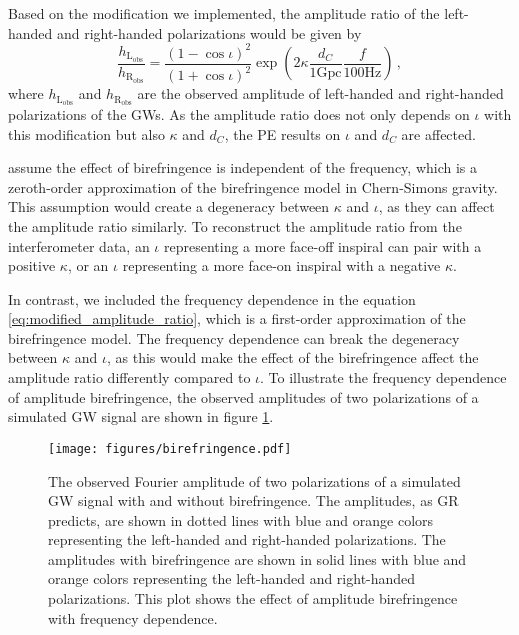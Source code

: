 \documentclass[aps,prd,twocolumn,superscriptaddress,preprintnumbers,floatfix,nofootinbib]{revtex4-2}
\begin{document}
Based on the modification we implemented, the amplitude ratio of the left-handed and right-handed polarizations would be given by
\begin{equation}
    \frac{h_\mathrm{L_{obs}}}{h_\mathrm{R_{obs}}}=\frac{\left(1-\cos\iota\right)^2}{\left(1+\cos\iota\right)^2}\exp\left({2\kappa\frac{d_C}{1\mathrm{Gpc}}\frac{f}{100\mathrm{Hz}}}\right)\,,
    \label{eq:modified_amplitude_ratio}
\end{equation}
where $h_\mathrm{L_{obs}}$ and $h_\mathrm{R_{obs}}$ are the observed amplitude of left-handed and right-handed polarizations of the GWs.
As the amplitude ratio does not only depends on $\iota$ with this modification but also $\kappa$ and $d_C$, the PE results on $\iota$ and $d_C$ are affected.

\citet{Okounkova_2022} assume the effect of birefringence is independent of the frequency, which is a zeroth-order approximation of the birefringence model in Chern-Simons gravity.
This assumption would create a degeneracy between $\kappa$ and $\iota$, as they can affect the amplitude ratio similarly.
To reconstruct the amplitude ratio from the interferometer data, an $\iota$ representing a more face-off inspiral can pair with a positive $\kappa$, or an $\iota$ representing a more face-on inspiral with a negative $\kappa$.

In contrast, we included the frequency dependence in the equation \ref{eq:modified_amplitude_ratio}, which is a first-order approximation of the birefringence model.
The frequency dependence can break the degeneracy between $\kappa$ and $\iota$, as this would make the effect of the birefringence affect the amplitude ratio differently compared to $\iota$.
To illustrate the frequency dependence of amplitude birefringence, the observed amplitudes of two polarizations of a simulated GW signal are shown in figure \ref{fig:birefringence}.

\begin{figure}[h]
    \texttt{[image: figures/birefringence.pdf]}
    \caption{
        The observed Fourier amplitude of two polarizations of a simulated GW signal with and without birefringence.
        The amplitudes, as GR predicts, are shown in dotted lines with blue and orange colors representing the left-handed and right-handed polarizations.
        The amplitudes with birefringence are shown in solid lines with blue and orange colors representing the left-handed and right-handed polarizations.
        This plot shows the effect of amplitude birefringence with frequency dependence.
    }
    \label{fig:birefringence}
\end{figure}
\end{document}
